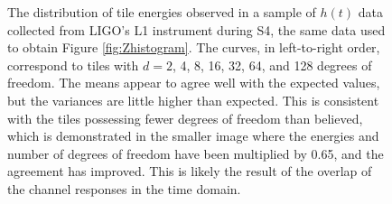 \documentclass{article}
\begin{document}
\begin{figure}
\begin{center}
\end{center}
\caption{The distribution of tile energies observed in a sample of \(h(t)\)
data collected from LIGO's L1 instrument during S4, the same data used to
obtain Figure \ref{fig:Zhistogram}.  The curves, in left-to-right order,
correspond to tiles with \(d = 2\), 4, 8, 16, 32, 64, and 128 degrees of
freedom.  The means appear to agree well with the expected values, but the
variances are little higher than expected.  This is consistent with the
tiles possessing fewer degrees of freedom than believed, which is
demonstrated in the smaller image where the energies and number of degrees
of freedom have been multiplied by 0.65, and the agreement has improved.
This is likely the result of the overlap of the channel responses in the
time domain.}
\label{fig:ehistogram}
\end{figure}
\end{document}
